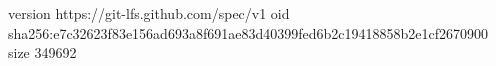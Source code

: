 version https://git-lfs.github.com/spec/v1
oid sha256:e7c32623f83e156ad693a8f691ae83d40399fed6b2c19418858b2e1cf2670900
size 349692
